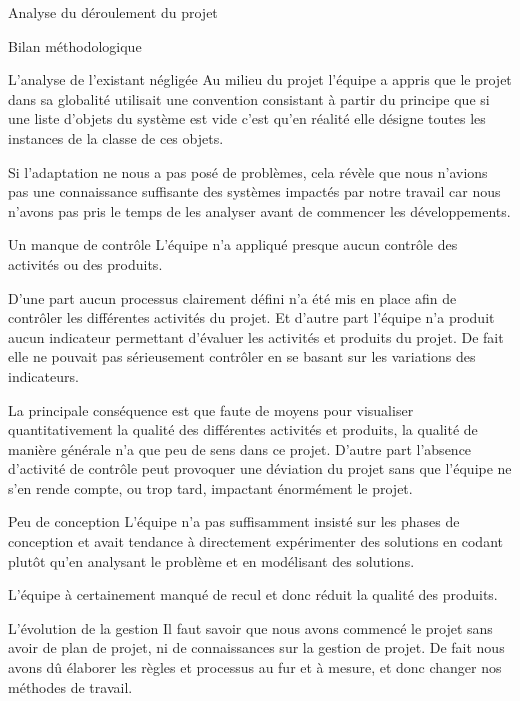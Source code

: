 \documentclass[]{article}
\begin{document}
{\begin{section}{Analyse du déroulement du projet}
 \begin{subsection}{Bilan méthodologique}
     \begin{subsubsection}{L'analyse de l'existant négligée}
         Au milieu du projet l'équipe a appris que le projet dans sa globalité utilisait une convention consistant à partir du principe que si une liste d'objets du système est vide c'est qu'en réalité elle désigne toutes les instances de la classe de ces objets.

         Si l'adaptation ne nous a pas posé de problèmes, cela révèle que nous n'avions pas une connaissance suffisante des systèmes impactés par notre travail car nous n'avons pas pris le temps de les analyser avant de commencer les développements.
     \end{subsubsection}

     \begin{subsubsection}{Un manque de contrôle}
         L'équipe n'a appliqué presque aucun contrôle des activités ou des produits.

         D'une part aucun processus clairement défini n'a été mis en place afin de contrôler les différentes activités du projet. Et d'autre part l'équipe n'a produit aucun indicateur permettant d'évaluer les activités et produits du projet. De fait elle ne pouvait pas sérieusement contrôler en se basant sur les variations des indicateurs.

         La principale conséquence est que faute de moyens pour visualiser quantitativement la qualité des différentes activités et produits, la qualité de manière générale n'a que peu de sens dans ce projet. D'autre part l'absence d'activité de contrôle peut provoquer une déviation du projet sans que l'équipe ne s'en rende compte, ou trop tard, impactant énormément le projet.
     \end{subsubsection}

     \begin{subsubsection}{Peu de conception}
         L'équipe n'a pas suffisamment insisté sur les phases de conception et avait tendance à directement expérimenter des solutions en codant plutôt qu'en analysant le problème et en modélisant des solutions.

         L'équipe à certainement manqué de recul et donc réduit la qualité des produits.
     \end{subsubsection}

     \begin{subsubsection}{L'évolution de la gestion}
         Il faut savoir que nous avons commencé le projet sans avoir de plan de projet, ni de connaissances sur la gestion de projet. De fait nous avons dû élaborer les règles et processus au fur et à mesure, et donc changer nos méthodes de travail.


\end{subsubsection}
\end{subsection}
\end{section}}
\end{document}
